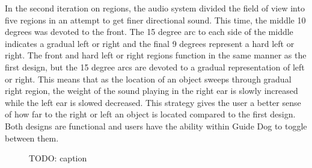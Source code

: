 In the second iteration on regions, the audio system divided the field of view
into five regions in an attempt to get finer directional sound. This time, the
middle 10 degrees was devoted to the front. The 15 degree arc to each side of
the middle indicates a gradual left or right and the final 9 degrees represent
a hard left or right. The front and hard left or right regions function in the
same manner as the first design, but the 15 degree arcs are devoted to a gradual
representation of left or right. This means that as the location of an object
sweeps through gradual right region, the weight of the sound playing in the
right ear is slowly increased while the left ear is slowed decreased. This
strategy gives the user a better sense of how far to the right or left an object
is located compared to the first design. Both designs are functional and users
have the ability within Guide Dog to toggle between them.

\begin{figure}
\caption{TODO: caption}
\label{fig:regions}
\end{figure}
